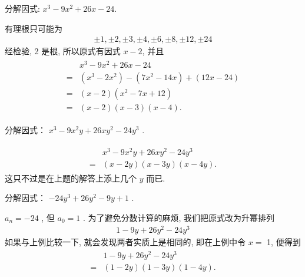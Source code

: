 \begin{example}
	分解因式: $x^{3}-9 x^{2}+26 x-24$.
\end{example}
\begin{solution}
	有理根只可能为
	\begin{align*}
		\pm 1, \pm 2, \pm 3, \pm 4, \pm 6, \pm 8, \pm 12, \pm 24
	\end{align*}
	经检验, 2 是根, 所以原式有因式 $x-2$, 并且
	\begin{align*}
		\begin{aligned}
			  & x^{3}-9 x^{2}+26 x-24                                          \\
			= & \left(x^{3}-2 x^{2}\right)-\left(7 x^{2}-14 x\right)+(12 x-24) \\
			= & (x-2)\left(x^{2}-7 x+12\right)                                 \\
			= & (x-2)(x-3)(x-4) .
		\end{aligned}
	\end{align*}
\end{solution}

\begin{example}
	分解因式： $x^{3}-9 x^{2} y+26 x y^{2}-24 y^{3}$ . 
\end{example}
\begin{solution}
	\begin{align*}
		\begin{aligned}
			  & x^{3}-9 x^{2} y+26 x y^{2}-24 y^{3} \\
			= & (x-2 y)(x-3 y)(x-4 y) .
		\end{aligned}
	\end{align*}
这只不过是在上题的解答上添上几个 $y$ 而已. 
\end{solution}

\begin{example}
	分解因式： $-24 y^{3}+26 y^{2}-9 y+1$ . 
\end{example}
\begin{solution}
	$a_{n}=-24$ , 但 $a_{0}=1$ . 为了避免分数计算的麻烦, 我们把原式改为升幂排列
	\begin{align*}
		1-9 y+26 y^{2}-24 y^{3}
	\end{align*}
	如果与上例比较一下, 就会发现两者实质上是相同的, 即在上例中令 $x=$ 1, 便得到
	\begin{align*}
		\begin{aligned}
			  & 1-9 y+26 y^{2}-24 y^{3} \\
			= & (1-2 y)(1-3 y)(1-4 y) .
		\end{aligned}
	\end{align*}
\end{solution}

